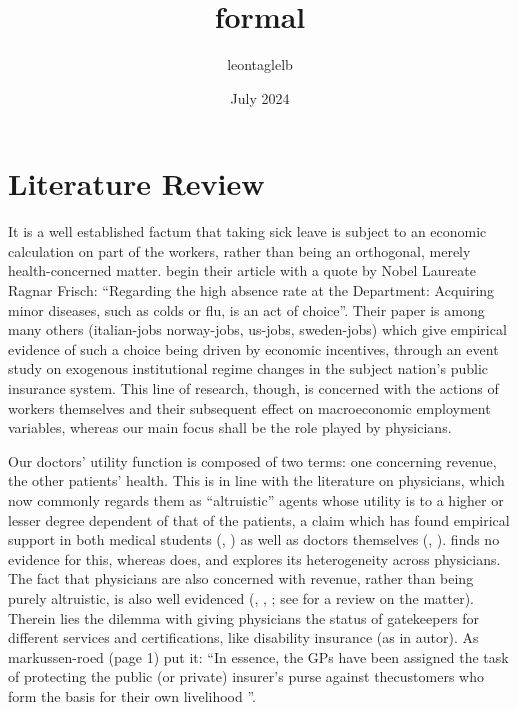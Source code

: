 \documentclass{article}
\title{formal}
\author{leontaglelb }
\date{July 2024}
\begin{document}
\maketitle

\section{Literature Review}


It is a well established factum that taking sick leave is subject to an economic calculation on part of the workers, rather than being an orthogonal, merely health-concerned matter. \cite{JohanssonPalme} begin their article with a quote by Nobel Laureate Ragnar Frisch: ``Regarding the high absence rate at the Department: Acquiring minor diseases, such as colds or flu, is an act of choice''. Their paper is among many others (italian-jobs
norway-jobs, us-jobs, sweden-jobs) which give empirical evidence of such a choice being driven by economic incentives, through an event study on exogenous institutional regime changes in the subject nation's public insurance system. This line of research, though, is concerned with the actions of workers themselves and their subsequent effect on macroeconomic employment variables, whereas our main focus shall be the role played by physicians.

Our doctors' utility function is composed of two terms: one concerning revenue, the other patients' health. This is in line with the literature on physicians, which now commonly regards them as ``altruistic'' agents whose utility is to a higher or lesser degree dependent of that of the patients, a claim which has found empirical support in both medical students (\cite{avengers}, \cite{hs-wiesen}) as well as doctors themselves (\cite{hippocrates}, \cite{brosigkoch}). \cite{crea2019physician} finds no evidence for this, whereas \cite{godager2013profit} does, and explores its heterogeneity across physicians. The fact that physicians are also concerned with revenue, rather than being purely altruistic, is also well evidenced (\cite{clemensgottlieb}, \cite{HSW}, \cite{autor}; see \cite{rrk2012} for a review on the matter). Therein lies the dilemma with giving physicians the status of gatekeepers for different services and certifications, like disability insurance (as in autor). As markussen-roed (page 1) put it: ``In essence, the GPs have been assigned the task of protecting the public (or private) insurer's purse against thecustomers who form the basis for their own livelihood ''.




\newpage
	 

\end{document}
